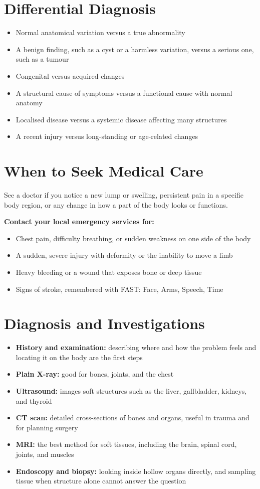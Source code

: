 \section*{Differential Diagnosis}
\begin{itemize}
    \item Normal anatomical variation versus a true abnormality
    \item A benign finding, such as a cyst or a harmless variation, versus a serious one, such as a tumour
    \item Congenital versus acquired changes
    \item A structural cause of symptoms versus a functional cause with normal anatomy
    \item Localised disease versus a systemic disease affecting many structures
    \item A recent injury versus long-standing or age-related changes
\end{itemize}

\section*{When to Seek Medical Care}
See a doctor if you notice a new lump or swelling, persistent pain in a specific body region, or any change in how a part of the body looks or functions.

\textbf{Contact your local emergency services for:}
\begin{itemize}
    \item Chest pain, difficulty breathing, or sudden weakness on one side of the body
    \item A sudden, severe injury with deformity or the inability to move a limb
    \item Heavy bleeding or a wound that exposes bone or deep tissue
    \item Signs of stroke, remembered with FAST: Face, Arms, Speech, Time
\end{itemize}

\section*{Diagnosis and Investigations}
\begin{itemize}
    \item \textbf{History and examination:} describing where and how the problem feels and locating it on the body are the first steps
    \item \textbf{Plain X-ray:} good for bones, joints, and the chest
    \item \textbf{Ultrasound:} images soft structures such as the liver, gallbladder, kidneys, and thyroid
    \item \textbf{CT scan:} detailed cross-sections of bones and organs, useful in trauma and for planning surgery
    \item \textbf{MRI:} the best method for soft tissues, including the brain, spinal cord, joints, and muscles
    \item \textbf{Endoscopy and biopsy:} looking inside hollow organs directly, and sampling tissue when structure alone cannot answer the question
\end{itemize}

